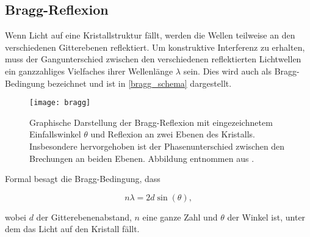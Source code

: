 \subsection{Bragg-Reflexion}
Wenn Licht auf eine Kristallstruktur fällt, werden die Wellen teilweise an den verschiedenen Gitterebenen reflektiert. Um konstruktive Interferenz zu erhalten, muss der Gangunterschied zwischen den verschiedenen reflektierten Lichtwellen ein ganzzahliges Vielfaches ihrer Wellenlänge $\lambda$ sein. Dies wird auch als Bragg-Bedingung bezeichnet und ist in \autoref{bragg_schema} dargestellt.
\begin{figure}[H]
	\centering
	\texttt{[image: bragg]}
	\caption{Graphische Darstellung der Bragg-Reflexion mit eingezeichnetem Einfallswinkel $\theta$ und Reflexion an zwei Ebenen des Kristalls. Insbesondere hervorgehoben ist der Phasenunterschied zwischen den Brechungen an beiden Ebenen. Abbildung entnommen aus \cite{bragg}. }
	\label{bragg_schema}
\end{figure}


Formal besagt die Bragg-Bedingung, dass

\begin{equation}\label{eqn:bragg}
	n\lambda = 2d\sin(\theta),
\end{equation}

wobei \( d \) der Gitterebenenabstand, \( n \) eine ganze Zahl und \( \theta \) der Winkel ist, unter dem das Licht auf den Kristall fällt. 



